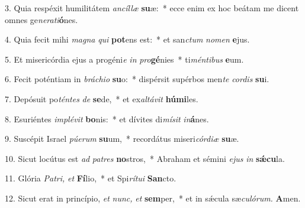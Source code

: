 \item 3. Quia respéxit humilitátem \textit{ancíllæ} \textbf{su}æ:~* ecce enim ex hoc beátam me dicent omnes ge\textit{nerati}\textbf{ó}nes.

\item 4. Quia fecit mihi \textit{magna} \textit{qui} \textbf{pot}ens est:~* et san\textit{ctum} \textit{nomen} \textbf{e}jus.

\item 5. Et misericórdia ejus a progéni\textit{e} \textit{in} \textit{pro}\textbf{gé}nies~* ti\textit{méntibus} \textbf{e}um.

\item 6. Fecit poténtiam in \textit{bráchio} \textbf{su}o:~* dispérsit supérbos men\textit{te} \textit{cordis} \textbf{su}i.

\item 7. Depósuit po\textit{téntes} \textit{de} \textbf{se}de,~* et ex\hspace{0.03em}\textit{altávit} \textbf{hú}\textbf{mi}les.

\item 8. Esuriéntes \textit{implévit} \textbf{bo}nis:~* et dívites di\textit{mísit} \textit{in}\textbf{á}nes.

\item 9. Suscépit Israel \textit{púerum} \textbf{su}um,~* recordátus miseri\hspace{0.01em}\textit{córdiæ} \textbf{su}æ.

\item 10. Sicut locútus est \textit{ad} \textit{patres} \textbf{no}stros,~* Abraham et sémini \textit{ejus} \textit{in} \textbf{sǽ}\textbf{cu}la.

\item 11. Glória \textit{Patri,} \textit{et} \textbf{Fí}lio,~* et Spi\textit{rítui} \textbf{San}cto.

\item 12. Sicut erat in princípio, \textit{et} \textit{nunc,} \textit{et} \textbf{sem}per,~* et in sǽcula sæ\hspace{0.01em}\textit{culórum.} \textbf{A}men.